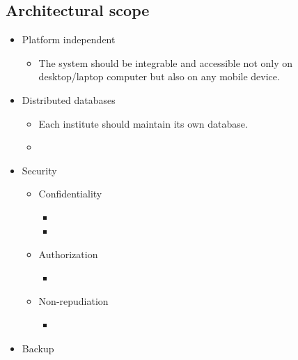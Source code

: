 \subsection{Architectural scope}

\begin{itemize}
  \item Platform independent
      \begin{itemize}
        \item The system should be integrable and accessible not only on desktop/laptop computer but also on any mobile device.
      \end{itemize}
      
  \item Distributed databases
      \begin{itemize}
        \item Each institute should maintain its own database.     
        \item     
      \end{itemize}
  
  \item Security
      \begin{itemize}
        \item Confidentiality    
      
              \begin{itemize}
                \item  
                \item  
              \end{itemize}
      
        \item Authorization  
        
              \begin{itemize}
                \item  
              \end{itemize}
              
        \item Non-repudiation
        
              \begin{itemize}
                \item  
              \end{itemize}

        
      \end{itemize}
      
        \item Backup
        

\end{itemize}
